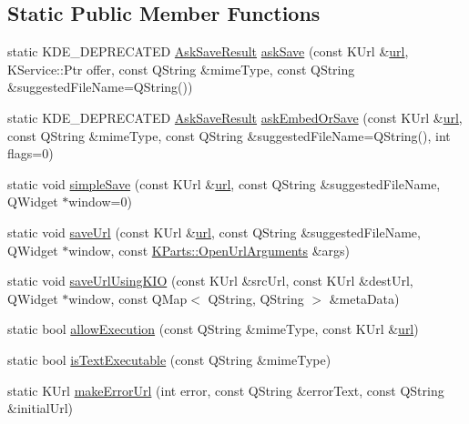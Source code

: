 \subsection*{\-Static \-Public \-Member \-Functions}
\begin{DoxyCompactItemize}
\item 
static \-K\-D\-E\-\_\-\-D\-E\-P\-R\-E\-C\-A\-T\-E\-D \hyperlink{classKParts_1_1BrowserRun_a32ee53f65c723ec01f4c4c28e91db8e6}{\-Ask\-Save\-Result} \hyperlink{classKParts_1_1BrowserRun_a240c17aac1cd740315731916f0616723}{ask\-Save} (const \-K\-Url \&\hyperlink{classKParts_1_1BrowserRun_ad3f7d10647ab8b5a77399f46df92046b}{url}, \-K\-Service\-::\-Ptr offer, const \-Q\-String \&mime\-Type, const \-Q\-String \&suggested\-File\-Name=\-Q\-String())
\item 
static \-K\-D\-E\-\_\-\-D\-E\-P\-R\-E\-C\-A\-T\-E\-D \hyperlink{classKParts_1_1BrowserRun_a32ee53f65c723ec01f4c4c28e91db8e6}{\-Ask\-Save\-Result} \hyperlink{classKParts_1_1BrowserRun_a548576ed0ee79c29f1b68d16922ae6bd}{ask\-Embed\-Or\-Save} (const \-K\-Url \&\hyperlink{classKParts_1_1BrowserRun_ad3f7d10647ab8b5a77399f46df92046b}{url}, const \-Q\-String \&mime\-Type, const \-Q\-String \&suggested\-File\-Name=\-Q\-String(), int flags=0)
\item 
static void \hyperlink{classKParts_1_1BrowserRun_a38a97c58c4a3bb15e3de9e5cdf7fb24a}{simple\-Save} (const \-K\-Url \&\hyperlink{classKParts_1_1BrowserRun_ad3f7d10647ab8b5a77399f46df92046b}{url}, const \-Q\-String \&suggested\-File\-Name, \-Q\-Widget $\ast$window=0)
\item 
static void \hyperlink{classKParts_1_1BrowserRun_a75d80364750fd734cabccaa8a818a48d}{save\-Url} (const \-K\-Url \&\hyperlink{classKParts_1_1BrowserRun_ad3f7d10647ab8b5a77399f46df92046b}{url}, const \-Q\-String \&suggested\-File\-Name, \-Q\-Widget $\ast$window, const \hyperlink{classKParts_1_1OpenUrlArguments}{\-K\-Parts\-::\-Open\-Url\-Arguments} \&args)
\item 
static void \hyperlink{classKParts_1_1BrowserRun_a76f09a0166b39cf15e02df97765d8d0a}{save\-Url\-Using\-K\-I\-O} (const \-K\-Url \&src\-Url, const \-K\-Url \&dest\-Url, \-Q\-Widget $\ast$window, const \-Q\-Map$<$ \-Q\-String, \-Q\-String $>$ \&meta\-Data)
\item 
static bool \hyperlink{classKParts_1_1BrowserRun_adc6f66d941b8361b6808f4d6dcee312b}{allow\-Execution} (const \-Q\-String \&mime\-Type, const \-K\-Url \&\hyperlink{classKParts_1_1BrowserRun_ad3f7d10647ab8b5a77399f46df92046b}{url})
\item 
static bool \hyperlink{classKParts_1_1BrowserRun_a5e9221ceeeaddac5b6f0929c9298afa6}{is\-Text\-Executable} (const \-Q\-String \&mime\-Type)
\item 
static \-K\-Url \hyperlink{classKParts_1_1BrowserRun_a07ae3b98d8050e48980711788c2b84d8}{make\-Error\-Url} (int error, const \-Q\-String \&error\-Text, const \-Q\-String \&initial\-Url)
\end{DoxyCompactItemize}
